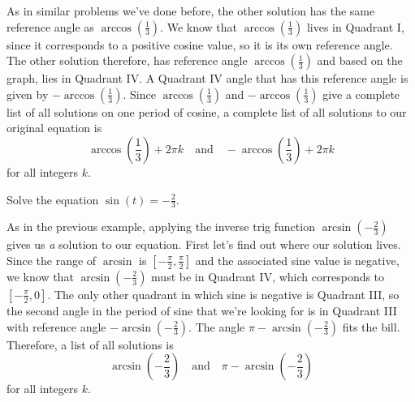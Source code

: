 \documentclass{ximera}
\begin{document}
\begin{example}
\begin{explanation}
As in similar problems we've done before, the other solution has the same reference angle as $\arccos\left(\frac{1}{3}\right)$. We know that $\arccos\left(\frac{1}{3}\right)$ lives in Quadrant I, since it corresponds to a positive cosine value, so it is its own reference angle. The other solution therefore, has reference angle $\arccos\left(\frac{1}{3}\right)$ and based on the graph, lies in Quadrant IV. A Quadrant IV angle that has this reference angle is given by $-\arccos\left(\frac{1}{3}\right)$. Since $\arccos\left(\frac{1}{3}\right)$ and $-\arccos\left(\frac{1}{3}\right)$ give a complete list of all solutions on one period of cosine, a complete list of all solutions to our original equation is 
$$\arccos\left(\frac{1}{3}\right) + 2\pi k \quad \text{and} \quad-\arccos\left(\frac{1}{3}\right) + 2\pi k$$
 for all integers $k$.

\end{explanation}
\end{example}

\begin{example}
Solve the equation $\sin(t) = -\frac{2}{3}$. 
\begin{explanation}
As in the previous example, applying the inverse trig function $\arcsin\left(-\frac{2}{3}\right)$ gives us \emph{a} solution to our equation. First let's find out where our solution lives. Since the range of $\arcsin$ is $\left[-\frac{\pi}{2}, \frac{\pi}{2}\right]$ and the associated sine value is negative, we know that $\arcsin\left(-\frac{2}{3}\right)$ must be in Quadrant IV, which corresponds to $\left[-\frac{\pi}{2}, 0\right]$. The only other quadrant in which sine is negative is Quadrant III, so the second angle in the period of sine that we're looking for is in Quadrant III with reference angle $-\arcsin\left(-\frac{2}{3}\right)$. The angle $\pi - \arcsin\left(-\frac{2}{3}\right)$ fits the bill. Therefore, a list of all solutions is 
$$\arcsin\left(-\frac{2}{3}\right) \quad \text{and} \quad \pi - \arcsin\left(-\frac{2}{3}\right)$$
for all integers $k$. 
\end{explanation}
\end{example}
\end{document}

